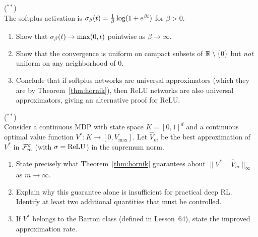 \documentclass[11pt,a4paper]{article}
\begin{document}
\begin{exercise}
\textnormal{(\({}^{**}\))} \\
The softplus activation is $\sigma_\beta(t) = \frac{1}{\beta}
\log(1 + e^{\beta t})$ for $\beta > 0$.
\begin{enumerate}[label=(\alph*)]
  \item Show that $\sigma_\beta(t) \to \max(0, t)$ pointwise as
    $\beta \to \infty$.
  \item Show that the convergence is uniform on compact subsets of
    $\mathbb{R} \setminus \{0\}$ but \emph{not} uniform on any neighborhood of
    $0$.
  \item Conclude that if softplus networks are universal approximators
    (which they are by Theorem~\ref{thm:hornik}), then ReLU networks are
    also universal approximators, giving an alternative proof for ReLU.
\end{enumerate}
\end{exercise}

\begin{exercise}
\textnormal{(\({}^{**}\))} \\
Consider a continuous MDP with state space $K = [0,1]^d$ and a continuous
optimal value function $V^* \colon K \to [0, V_{\max}]$.  Let
$\hat{V}_m$ be the best approximation of $V^*$ in $\mathcal{F}_m^{\sigma}$
(with $\sigma = \text{ReLU}$) in the supremum norm.
\begin{enumerate}[label=(\alph*)]
  \item State precisely what Theorem~\ref{thm:hornik} guarantees about
    $\|V^* - \hat{V}_m\|_\infty$ as $m \to \infty$.
  \item Explain why this guarantee alone is insufficient for practical
    deep RL.  Identify at least two additional quantities that must be
    controlled.
  \item If $V^*$ belongs to the Barron class (defined in Lesson~64),
    state the improved approximation rate.
\end{enumerate}
\end{exercise}
\end{document}
